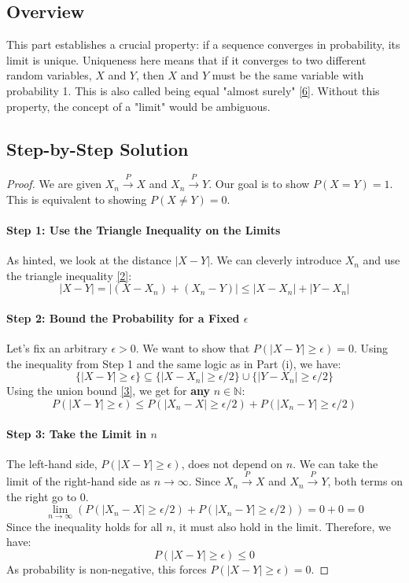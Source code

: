 \documentclass[11pt,a4paper]{article}
\theoremstyle{exercise}
\newcommand{\inDepthNote}[2]{\hyperref[#1]{[#2]}}
\begin{document}
\subsection*{Overview}
This part establishes a crucial property: if a sequence converges in probability, its limit is unique. Uniqueness here means that if it converges to two different random variables, $X$ and $Y$, then $X$ and $Y$ must be the same variable with probability 1. This is also called being equal "almost surely" \inDepthNote{note:almost-surely}{6}. Without this property, the concept of a "limit" would be ambiguous.

\subsection*{Step-by-Step Solution}
\begin{proof}
We are given $X_n \xrightarrow{P} X$ and $X_n \xrightarrow{P} Y$. Our goal is to show $P(X = Y) = 1$. This is equivalent to showing $P(X \neq Y) = 0$.

\paragraph{Step 1: Use the Triangle Inequality on the Limits}
As hinted, we look at the distance $|X - Y|$. We can cleverly introduce $X_n$ and use the triangle inequality \inDepthNote{note:triangle}{2}:
\[
|X - Y| = |(X - X_n) + (X_n - Y)| \le |X - X_n| + |Y - X_n|
\]
\paragraph{Step 2: Bound the Probability for a Fixed $\epsilon$}
Let's fix an arbitrary $\epsilon > 0$. We want to show that $P(|X - Y| \ge \epsilon) = 0$. Using the inequality from Step 1 and the same logic as in Part (i), we have:
\[
\{|X - Y| \ge \epsilon\} \subseteq \{|X - X_n| \ge \epsilon/2\} \cup \{|Y - X_n| \ge \epsilon/2\}
\]
Using the union bound \inDepthNote{note:union-bound}{3}, we get for \textbf{any} $n \in \mathbb{N}$:
\[
P(|X - Y| \ge \epsilon) \le P(|X_n - X| \ge \epsilon/2) + P(|X_n - Y| \ge \epsilon/2)
\]
\paragraph{Step 3: Take the Limit in $n$}
The left-hand side, $P(|X - Y| \ge \epsilon)$, does not depend on $n$. We can take the limit of the right-hand side as $n \to \infty$. Since $X_n \xrightarrow{P} X$ and $X_n \xrightarrow{P} Y$, both terms on the right go to 0.
\[
\lim_{n \to \infty} \left( P(|X_n - X| \ge \epsilon/2) + P(|X_n - Y| \ge \epsilon/2) \right) = 0 + 0 = 0
\]
Since the inequality holds for all $n$, it must also hold in the limit. Therefore, we have:
\[
P(|X - Y| \ge \epsilon) \le 0
\]
As probability is non-negative, this forces $P(|X - Y| \ge \epsilon) = 0$.


\end{proof}
\end{document}
